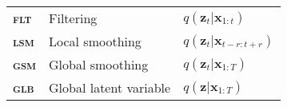 {\begin{table}
\begin{center}
\begin{tabular}{ l l l }
            \textbf{\textsc{flt}} & Filtering                             & $q(\mathbf{z}_t|\mathbf{x}_{1:t})$ \\
            \textbf{\textsc{lsm}} & Local smoothing                       & $q(\mathbf{z}_t|\mathbf{x}_{t-r:t+r})$ \\
            \textbf{\textsc{gsm}} & Global smoothing                      & $q(\mathbf{z}_t|\mathbf{x}_{1:T})$ \\
            \textbf{\textsc{glb}} & Global latent variable                & $q(\mathbf{z}|\mathbf{x}_{1:T})$ \\
            \bottomrule
        \end{tabular}
    \end{center}
\end{table}

}
